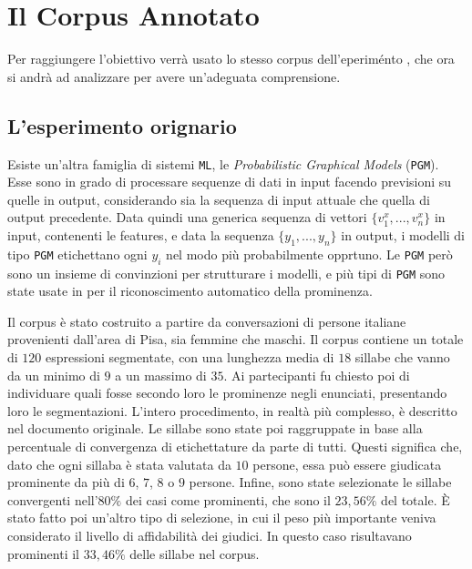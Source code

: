 \documentclass[twoside,twocolumn,10pt]{extarticle}
\theoremstyle{definition}
\begin{document}
\section{Il Corpus Annotato}\label{sec:corpus}
	Per raggiungere l'obiettivo verrà usato lo stesso corpus dell'eperiménto \cite{bib:prominence-detection-italian}, che ora si andrà ad analizzare per avere un'adeguata comprensione.
	
	\subsection{L'esperimento orignario}
		Esiste un'altra famiglia di sistemi \texttt{ML}, le \textit{Probabilistic Graphical Models} (\texttt{PGM}). Esse sono in grado di processare sequenze di dati in input facendo previsioni su quelle in output, considerando sia la sequenza di input attuale che quella di output precedente. Data quindi una generica sequenza di vettori $\{v^x_1, ..., v^x_n\}$ in input, contenenti le features, e data la sequenza $\{y_1, ..., y_n\}$ in output, i modelli di tipo \texttt{PGM} etichettano ogni $y_i$ nel modo più probabilmente opprtuno. Le \texttt{PGM} però sono un insieme di convinzioni per strutturare i modelli, e più tipi di \texttt{PGM} sono state usate in \cite{bib:prominence-detection-italian} per il riconoscimento automatico della prominenza.
	
		Il corpus è stato costruito a partire da conversazioni di persone italiane provenienti dall'area di Pisa, sia femmine che maschi. Il corpus contiene un totale di $120$ espressioni segmentate, con una lunghezza media di $18$ sillabe che vanno da un minimo di $9$ a un massimo di $35$. Ai partecipanti fu chiesto poi di individuare quali fosse secondo loro le prominenze negli enunciati, presentando loro le segmentazioni. L'intero procedimento, in realtà più complesso, è descritto nel documento originale. Le sillabe sono state poi raggruppate in base alla percentuale di convergenza di etichettature da parte di tutti. Questi significa che, dato che ogni sillaba è stata valutata da $10$ persone, essa può essere giudicata prominente da più di $6$, $7$, $8$ o $9$ persone. Infine, sono state selezionate le sillabe convergenti nell'$80\%$ dei casi come prominenti, che sono il $23,56\%$ del totale. È stato fatto poi un'altro tipo di selezione, in cui il peso più importante veniva considerato il livello di affidabilità dei giudici. In questo caso risultavano prominenti il $33,46\%$ delle sillabe nel corpus.
		
\end{document}
